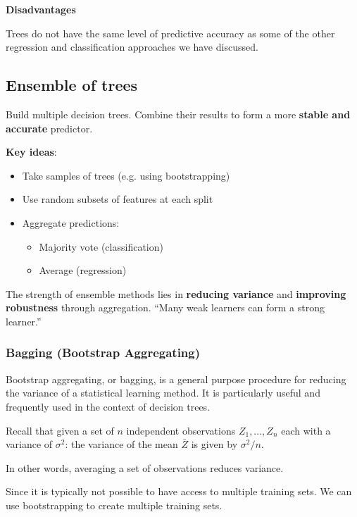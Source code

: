 \noindent\textbf{Disadvantages}

Trees do not have the same level of predictive accuracy as some of the other regression and classification approaches we have discussed.

\subsection{Ensemble of trees}

\indent 

Build multiple decision trees. Combine their results to form a more \textbf{stable and accurate} predictor.

\noindent\textbf{Key ideas}:

\begin{itemize}
    \item Take samples of trees (e.g. using bootstrapping)
    \item Use random subsets of features at each split
    \item Aggregate predictions:
    \begin{itemize}
        \item Majority vote (classification)
        \item Average (regression)
    \end{itemize}
\end{itemize}

The strength of ensemble methods lies in \textbf{reducing variance} and \textbf{improving robustness} through aggregation. “Many weak learners can form a strong learner.”

\subsubsection{Bagging (Bootstrap Aggregating)}

\indent 

Bootstrap aggregating, or bagging, is a general purpose procedure for reducing the variance of a statistical learning method. It is particularly useful and frequently used in the context of decision trees.

Recall that given a set of $n$ independent observations $Z_1,\ldots,Z_n$ each with a variance of $\sigma^2$: the variance of the mean $\bar{Z}$ is given by $\sigma^2/n$.

In other words, averaging a set of observations reduces variance.

Since it is typically not possible to have access to multiple training sets. We can use bootstrapping to create multiple training sets.

